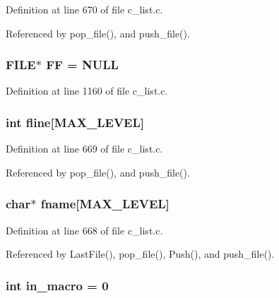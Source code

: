 Definition at line 670 of file c\_\-list.c.

Referenced by pop\_\-file(), and push\_\-file().
\subsubsection{\setlength{\rightskip}{0pt plus 5cm}FILE$\ast$ \bf{FF} = NULL\hspace{0.3cm}{\tt  [static]}}\label{c__list_8c_8d300a1bc2030270e6d8c8d7223b708c}




Definition at line 1160 of file c\_\-list.c.
\subsubsection{\setlength{\rightskip}{0pt plus 5cm}int \bf{fline}[MAX\_\-LEVEL]\hspace{0.3cm}{\tt  [static]}}\label{c__list_8c_e38970477047623ea0357004392750b5}




Definition at line 669 of file c\_\-list.c.

Referenced by pop\_\-file(), and push\_\-file().
\subsubsection{\setlength{\rightskip}{0pt plus 5cm}char$\ast$ \bf{fname}[MAX\_\-LEVEL]\hspace{0.3cm}{\tt  [static]}}\label{c__list_8c_57ef393a21195639a311f07a06a25cde}




Definition at line 668 of file c\_\-list.c.

Referenced by Last\-File(), pop\_\-file(), Push(), and push\_\-file().
\subsubsection{\setlength{\rightskip}{0pt plus 5cm}int \bf{in\_\-macro} = 0\hspace{0.3cm}{\tt  [static]}}\label{c__list_8c_4032f50916e1e628bcf451594bc97823}




